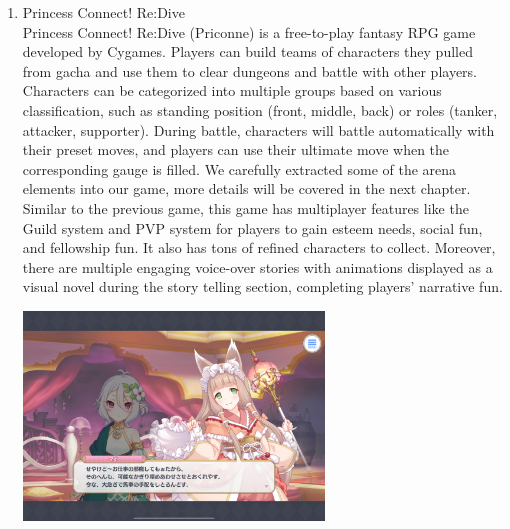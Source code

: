 \documentclass[12pt,oneside,openright,a4paper]{cpe-english-project}
\begin{document}
\begin{enumerate}
	\item Princess Connect! Re:Dive \\
	Princess Connect! Re:Dive (Priconne) is a free-to-play fantasy RPG game developed by Cygames. Players can build teams of characters they pulled from gacha and use them to clear dungeons and battle with other players. Characters can be categorized into multiple groups based on various classification, such as standing position (front, middle, back) or roles (tanker, attacker, supporter). During battle, characters will battle automatically with their preset moves, and players can use their ultimate move when the corresponding gauge is filled. We carefully extracted some of the arena elements into our game, more details will be covered in the next chapter. \\
	Similar to the previous game, this game has multiplayer features like the Guild system and PVP system for players to gain esteem needs, social fun, and fellowship fun. It also has tons of refined characters to collect. Moreover, there are multiple engaging voice-over stories with animations displayed as a visual novel during the story telling section, completing players' narrative fun. \\
	\begin{minipage}[c]{\textwidth}\centering
	\includegraphics[width=8cm]{figure/related-work-princon-story.png}
	\label{fig:related-work-princon-story}
	\end{minipage}
	\begin{minipage}[c]{\textwidth}\centering

\end{minipage}
\end{enumerate}
\end{document}
